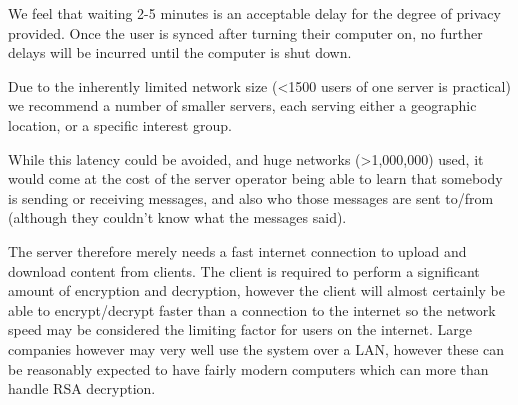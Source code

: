 We feel that waiting 2-5 minutes is an acceptable delay for the degree of privacy
provided. Once the user is synced after turning their computer on, no further
delays will be incurred until the computer is shut down.

Due to the inherently limited network size (\textless1500 users of one server is
practical) we recommend a number of smaller servers, each serving either a
geographic location, or a specific interest group.

While this latency could be avoided, and huge networks (\textgreater1,000,000)
used, it would come at the cost of the server operator being able to learn that
somebody is sending or receiving messages, and also who those messages are sent
to/from (although they couldn't know what the messages said).

The server therefore merely needs a fast internet connection to upload and
download content from clients. The client is required to perform a significant
amount of encryption and decryption, however the client will almost certainly be
able to encrypt/decrypt faster than a connection to the internet so the network
speed may be considered the limiting factor for users on the internet. Large
companies however may very well use the system over a LAN, however these can be
reasonably expected to have fairly modern computers which can more than handle
RSA decryption.

